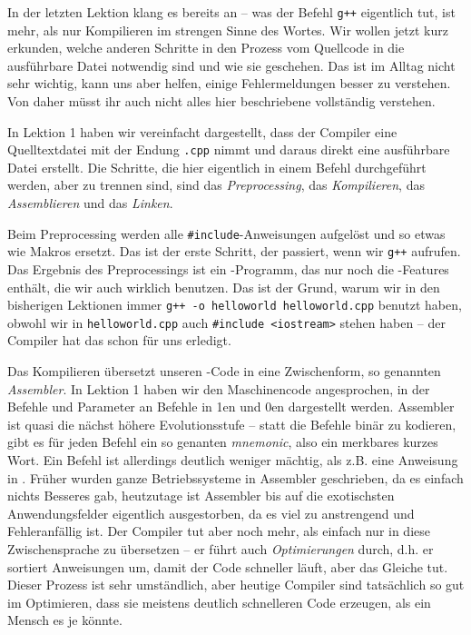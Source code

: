 
In der letzten Lektion klang es bereits an -- was der Befehl \texttt{g++}
eigentlich tut, ist mehr, als nur Kompilieren im strengen Sinne des Wortes. Wir
wollen jetzt kurz erkunden, welche anderen Schritte in den Prozess vom
Quellcode in die ausführbare Datei notwendig sind und wie sie geschehen. Das
ist im Alltag nicht sehr wichtig, kann uns aber helfen, einige Fehlermeldungen
besser zu verstehen. Von daher müsst ihr auch nicht alles hier beschriebene
vollständig verstehen.

In Lektion 1 haben wir vereinfacht dargestellt, dass der Compiler eine
Quelltextdatei mit der Endung \texttt{.cpp} nimmt und daraus direkt eine
ausführbare Datei erstellt. Die Schritte, die hier eigentlich in einem Befehl
durchgeführt werden, aber zu trennen sind, sind das \emph{Preprocessing}, das \emph{Kompilieren}, das
\emph{Assemblieren} und das \emph{Linken}.

Beim Preprocessing werden alle \texttt{\#include}-Anweisungen aufgelöst und so etwas wie Makros ersetzt. Das ist der erste Schritt, der passiert, wenn wir \texttt{g++} aufrufen. Das Ergebnis des Preprocessings ist ein \Cpp-Programm, das nur noch die \Cpp-Features enthält, die wir auch wirklich benutzen. Das ist der Grund, warum wir in den bisherigen Lektionen immer \texttt{g++ -o helloworld helloworld.cpp} benutzt haben, obwohl wir in \texttt{helloworld.cpp} auch \texttt{\#include <iostream>} stehen haben -- der Compiler hat das schon für uns erledigt.

Das Kompilieren übersetzt unseren \Cpp-Code in eine Zwischenform, so genannten
\emph{Assembler}. In Lektion 1 haben wir den Maschinencode angesprochen, in der
Befehle und Parameter an Befehle in 1en und 0en dargestellt werden. Assembler
ist quasi die nächst höhere Evolutionsstufe -- statt die Befehle binär zu
kodieren, gibt es für jeden Befehl ein so genanten \emph{mnemonic}, also ein
merkbares kurzes Wort. Ein Befehl ist allerdings deutlich weniger mächtig, als
z.B. eine Anweisung in \Cpp. Früher wurden ganze Betriebssysteme in Assembler
geschrieben, da es einfach nichts Besseres gab, heutzutage ist Assembler bis
auf die exotischsten Anwendungsfelder eigentlich ausgestorben, da es viel zu
anstrengend und Fehleranfällig ist. Der Compiler tut aber noch mehr, als
einfach nur in diese Zwischensprache zu übersetzen -- er führt auch
\emph{Optimierungen} durch, d.h. er sortiert Anweisungen um, damit der Code
schneller läuft, aber das Gleiche tut. Dieser Prozess ist sehr umständlich,
aber heutige Compiler sind tatsächlich so gut im Optimieren, dass sie meistens
deutlich schnelleren Code erzeugen, als ein Mensch es je könnte.

